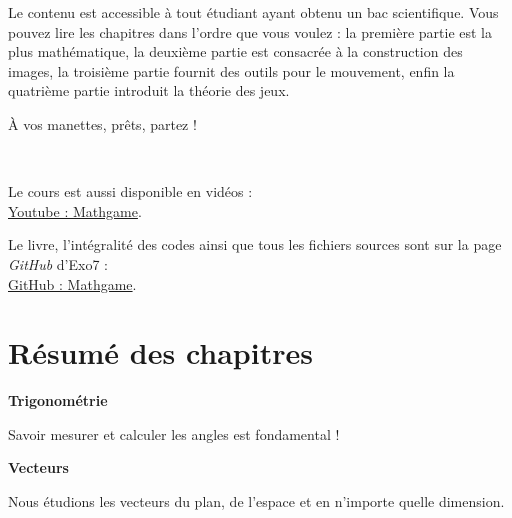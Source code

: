 \medskip

Le contenu est accessible à tout étudiant ayant obtenu un bac scientifique. Vous pouvez lire les chapitres dans l'ordre que vous voulez : la première partie est la plus mathématique, la deuxième partie est consacrée à la construction des images, la troisième partie fournit des outils pour le mouvement, enfin la quatrième partie introduit la théorie des jeux.

\medskip

À vos manettes, prêts, partez !
  

~
\bigskip
\vfill
\begin{center}
Le cours est aussi disponible en vidéos :\\
\href{https://www.youtube.com/@MathGame-Exo7}{Youtube : \og{}Mathgame\fg{}}.    
    
Le livre, l'intégralité des codes ainsi que tous les fichiers sources sont sur la page \emph{GitHub} d'Exo7 :\\
\href{https://github.com/exo7math/mathgame-exo7}{\og{}GitHub : Mathgame\fg{}}.
\end{center}
\vfill




\cleardoublepage
\thispagestyle{empty}
\tableofcontents

\cleardoublepage
\section*{Résumé des chapitres}


\newcommand{\titrechapitre}[1]{{\textbf{#1}}\nopagebreak}
\newcommand{\descriptionchapitre}[1]{%
\smallskip\hfill
\begin{minipage}{0.95\textwidth}\small#1\end{minipage}\medskip\smallskip}





\titrechapitre{Trigonométrie}

\descriptionchapitre{Savoir mesurer et calculer les angles est fondamental !}


\titrechapitre{Vecteurs}

\descriptionchapitre{Nous étudions les vecteurs du plan, de l'espace et en n'importe quelle dimension.}


